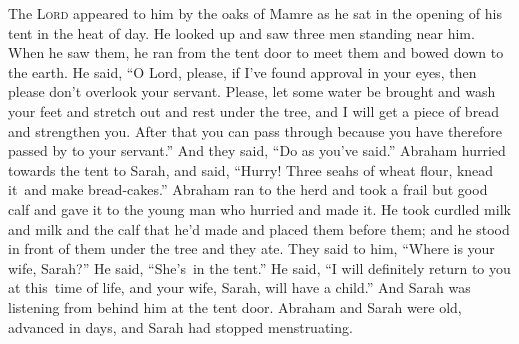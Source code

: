 
\begin{inparaenum}
   The \textsc{Lord} appeared to him by the oaks of Mamre as he sat in the opening of his tent in the heat of day.%
   He looked up and saw three men standing near him. When he saw them, he ran from the tent door to meet them and bowed down to the earth.%
   He said, ``O Lord, please, if I've found approval in your eyes, then please don't overlook your servant.%
   Please, let some water be brought and wash your feet and stretch out and rest under the tree,%
   and I will get a piece of bread and strengthen you. After that you can pass through because you have therefore passed by to your servant.'' And they said, ``Do as you've said.''%
   Abraham hurried towards the tent to Sarah, and said, ``Hurry! Three seahs of wheat flour, knead it\understood\ and make bread-cakes.''%
   Abraham ran to the herd and took a frail but good calf and gave it to the young man who hurried and made it.%
   He took curdled milk and milk and the calf that he'd made and placed them before them; and he stood in front of them under the tree and they ate.%
   They said to him, ``Where is your wife, Sarah?'' He said, ``She's\understood\ in the tent.''%
   He said, ``I will definitely return to you at this\understood\ time of life, and your wife, Sarah, will have a child.'' And Sarah was listening from behind him at the tent door.%
   Abraham and Sarah were old, advanced in days, and Sarah had stopped menstruating.%

\end{inparaenum}

